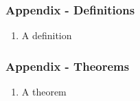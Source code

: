 \documentclass[
    11pt, %
    aspectratio=169, %
]{beamer}
\begin{document}
\begin{frame}[noframenumbering]
\label{Definitions}
	\frametitle{Appendix - Definitions}
         \begin{enumerate}
             \item A definition \newline
         \end{enumerate}
         
        \hyperlink{Test Stat}{}
\end{frame}

\begin{frame}[noframenumbering]
\label{Theorems}
	\frametitle{Appendix - Theorems}
         \begin{enumerate}
             \item A theorem\newline
         \end{enumerate}
         
        \hyperlink{Test Stat}{}        
\end{frame}
\end{document}
